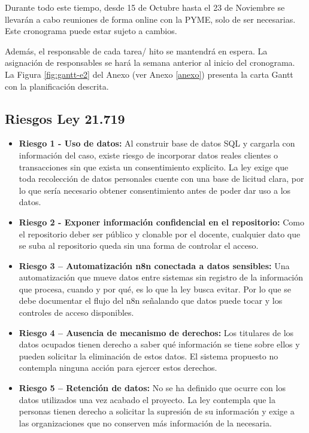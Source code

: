 \documentclass[11pt,letterpaper]{article}
\begin{document}
Durante todo este tiempo, desde 15 de Octubre hasta el 23 de Noviembre se llevarán a cabo reuniones de forma online con la PYME, solo de ser necesarias. Este cronograma puede estar sujeto a cambios.

Además, el responsable de cada tarea/ hito se mantendrá en espera. La asignación de responsables se hará la semana anterior al inicio del cronograma. La Figura \ref{fig:gantt-e2} del Anexo (ver Anexo \ref{anexo}) presenta la carta Gantt con la planificación descrita.

\subsection*{Riesgos Ley 21.719}
\begin{itemize}
    \item \textbf{Riesgo 1 - Uso de datos:} Al construir base de datos SQL y cargarla con información del caso, existe riesgo de incorporar datos reales clientes o transacciones sin que exista un consentimiento explicito. La ley exige que toda recolección de datos personales cuente con una base de licitud clara, por lo que sería necesario obtener consentimiento antes de poder dar uso a los datos.
    \item \textbf{Riesgo 2 - Exponer información confidencial en el repositorio:} Como el repositorio deber ser público y clonable por el docente, cualquier dato que se suba al repositorio queda sin una forma de controlar el acceso.
    \item \textbf{Riesgo 3 – Automatización n8n conectada a datos sensibles:} Una automatización que mueve datos entre sistemas sin registro de la información que procesa, cuando y por qué, es lo que la ley busca evitar. Por lo que se debe documentar el flujo del n8n señalando que datos puede tocar y los controles de acceso disponibles.
    \item \textbf{Riesgo 4 – Ausencia de mecanismo de derechos:} Los titulares de los datos ocupados tienen derecho a saber qué información se tiene sobre ellos y pueden solicitar la eliminación de estos datos. El sistema propuesto no contempla ninguna acción para ejercer estos derechos.
    \item \textbf{Riesgo 5 – Retención de datos:} No se ha definido que ocurre con los datos utilizados una vez acabado el proyecto. La ley contempla que la personas tienen derecho a solicitar la supresión de su información y exige a las organizaciones que no conserven más información de la necesaria.
\end{itemize}
\end{document}
